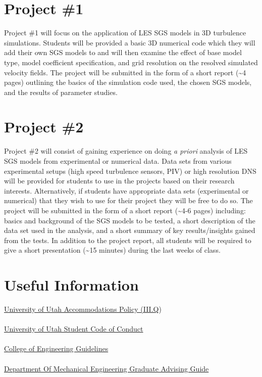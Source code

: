 \documentclass[11pt]{article}
\theoremstyle{mytheor}
\begin{document}
\section*{Project \#1}
Project \#1 will focus on the application of LES SGS models in 3D turbulence simulations.  Students will be provided a basic 3D numerical code which they will add their own SGS models to and will then examine the effect of base model type, model coefficient specification, and grid resolution on the resolved simulated velocity fields.  The project will be submitted in the form of a short report (\textasciitilde4 pages) outlining the basics of the simulation code used, the chosen SGS models, and the results of parameter studies.

\section*{Project \#2}
Project \#2 will consist of gaining experience on doing \textit{a priori} analysis of LES SGS models from experimental or numerical data.  Data sets from various experimental setups (high speed turbulence sensors, PIV) or high resolution DNS will be provided for students to use in the projects based on their research interests.  Alternatively, if students have appropriate data sets (experimental or numerical) that they wish to use for their project they will be free to do so. The project will be submitted in the form of a short report  (\textasciitilde4-6 pages) including: basics and background of the SGS models to be tested, a short description of the data set used in the analysis, and a short summary of key results/insights gained from the tests.  In addition to the project report, all students will be required to give a short presentation (\textasciitilde15 minutes) during the last weeks of class. 

\section*{Useful Information}
\href{http://regulations.utah.edu/academics/6-100.php}{University of Utah Accommodations Policy (III.Q})\\\\
\href{http://regulations.utah.edu/academics/6-400.php}{University of Utah Student Code of Conduct}\\\\
\href{http://www.coe.utah.edu/wp-content/uploads/pdf/faculty/semester_guidelines.pdf}{College of Engineering Guidelines}\\\\
\href{https://mech.utah.edu/files/2016/06/Grad-Handbook-AY-2015-20161.pdf}{Department Of Mechanical Engineering Graduate Advising Guide}
\end{document}
